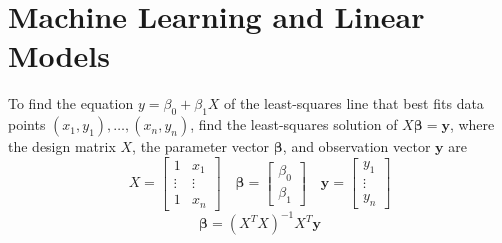 \documentclass{article}
\begin{document}
\pagebreak

\section*{Machine Learning and Linear Models}

To find the equation $y=\beta_0 + \beta_1 X$ of the least-squares line that best fits data points
$(x_1, y_1), \ldots, (x_n, y_n)$, find the least-squares solution of $X\mathbf{\beta}=\mathbf{y}$,
where the design matrix $X$, the parameter vector $\mathbf{\beta}$, and observation vector
$\mathbf{y}$ are
\[X=\begin{bmatrix}
    1 & x_1 \\ 
    \vdots & \vdots \\
    1 & x_n
\end{bmatrix}\quad \mathbf{\beta} = \begin{bmatrix}
    \beta_0 \\
    \beta_1
\end{bmatrix}\quad \mathbf{y} = \begin{bmatrix}
    y_1 \\
    \vdots \\
    y_n
\end{bmatrix}\]
\[\mathbf{\beta}={(X^T X)}^{-1} X^T \mathbf{y}\]
\end{document}
